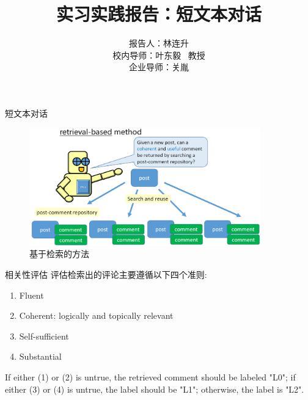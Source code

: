 \documentclass[aspectratio=169]{beamer}
\title{实习实践报告：短文本对话}
\author{报告人：林连升 \\ 校内导师：叶东毅 \ 教授 \\ 企业导师：关胤}
\institute{实习单位：福建天晴在线互动科技有限公司}
\date{}
\begin{document}
  \maketitle


    \begin{frame}{短文本对话}
      
      \begin{figure}
      \includegraphics[width=10cm,height=5.09cm]{stc2-ir-task.png}
      \caption{基于检索的方法}
      \end{figure}

    \end{frame}

    \begin{frame}{相关性评估}
      评估检索出的评论主要遵循以下四个准则:
      \begin{enumerate}
        \item Fluent
        \item Coherent: logically and topically relevant 
        \item Self-sufficient
        \item Substantial
      \end{enumerate}
      If either (1) or (2) is untrue, the retrieved comment should be labeled "L0"; if either (3) or (4) is untrue, the label should be "L1"; otherwise, the label is "L2".
    \end{frame}
\end{document}
